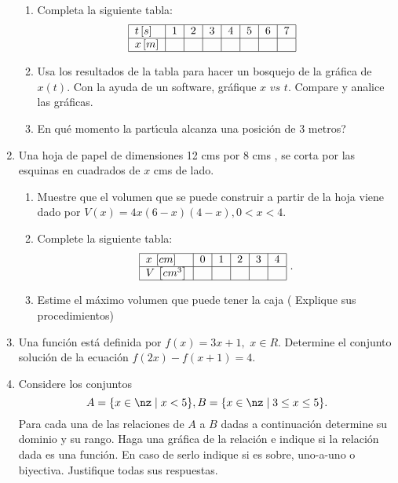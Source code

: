 \begin{enumerate}
\begin{enumerate}
\item Completa la siguiente tabla:%
\[%
\begin{tabular}
[c]{|l|l|l|l|l|l|l|l|}\hline
$t\left[  s\right]  $ & $1$ & $2$ & $3$ & $4$ & $5$ & $6$ & $7$\\\hline
$x\left[  m\right]  $ &  &  &  &  &  &  & \\\hline
\end{tabular}
\ \
\]


\item Usa los resultados de la tabla para hacer un bosquejo de la gr\'{a}fica
de $x\left(  t\right)  .$ Con la ayuda de un software, gr\'{a}fique $x$ $vs$
$t.$ Compare y analice las gr\'{a}ficas.

\item \textquestiondown En qu\'{e} momento la part\'{\i}cula alcanza una
posici\'{o}n de $3$ metros?
\end{enumerate}

\item Una hoja de papel de dimensiones 12 cms por 8 cms , se corta por las
esquinas en cuadrados de $x$ cms de lado.

\begin{enumerate}
\item Muestre que el volumen que se puede construir a partir de la hoja viene
dado por $V(x)=4x(6-x)(4-x),0<x<4.$

\item Complete la siguiente tabla:%
\[%
\begin{tabular}
[c]{|l|l|l|l|l|l|}\hline
$x$ $\left[  cm\right]  $ & $0$ & $1$ & $2$ & $3$ & $4$\\\hline
$V$ $\left[  cm^{3}\right]  $ &  &  &  &  & \\\hline
\end{tabular}
\ .
\]


\item Estime el m\'{a}ximo volumen que puede tener la caja ( Explique sus procedimientos)
\end{enumerate}

\item Una funci\'{o}n est\'{a} definida por $f(x)=3x+1,$ $x\in R$. Determine
el conjunto soluci\'{o}n de la ecuaci\'{o}n $f(2x)-f(x+1)=4.$

\item Considere los conjuntos
\[
A=\{x\in\nz\mid x<5\},B=\{x\in\nz\mid3\leq x\leq5\}.
\]
Para cada una de las relaciones de $A$ a $B$ dadas a continuaci\'{o}n
determine su dominio y su rango. Haga una gr\'{a}fica de la relaci\'{o}n e
indique si la relaci\'{o}n dada es una funci\'{o}n. En caso de serlo indique
si es sobre, uno-a-uno o biyectiva. Justifique todas sus respuestas.


\end{enumerate}
